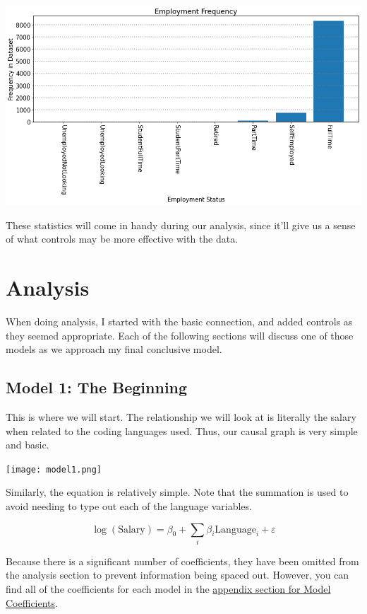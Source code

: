 \documentclass{report}
\begin{document}
\vspace{0.5in}

\includegraphics[width=0.9\linewidth]{frequencyEmployment.png}

\vspace{0.5in}

These statistics will come in handy during our analysis, since it'll give us a sense of what controls may be more effective with the data.

\chapter{Analysis}

When doing analysis, I started with the basic connection, and added controls as they seemed appropriate. Each of the following sections will discuss one of those models as we approach my final conclusive model.

\section{Model 1: The Beginning}

This is where we will start. The relationship we will look at is literally the salary when related to the coding languages used. Thus, our causal graph is very simple and basic.

\texttt{[image: model1.png]}

Similarly, the equation is relatively simple. Note that the summation is used to avoid needing to type out each of the language variables.

$$\log({\text{Salary}}) = \beta_0 + \sum_i{\beta_i \text{Language}_i} + \varepsilon$$

Because there is a significant number of coefficients, they have been omitted from the analysis section to prevent information being spaced out. However, you can find all of the coefficients for each model in the \hyperref[data:model1]{appendix section for Model Coefficients}.
\end{document}

